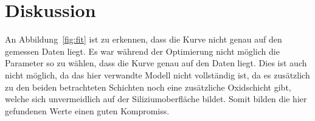 

\section{Diskussion}


An Abbildung~\ref{fig:fit} ist zu erkennen, dass die Kurve nicht genau auf den
gemessen Daten liegt. Es war während der Optimierung nicht möglich die
Parameter so zu wählen, dass die Kurve genau auf den Daten liegt.
Dies ist auch nicht möglich, da das hier verwandte Modell nicht vollständig ist,
da es zusätzlich zu den beiden betrachteten Schichten noch eine zusätzliche
Oxidschicht gibt, welche sich unvermeidlich auf der Siliziumoberfläche bildet.
Somit bilden die hier gefundenen Werte einen guten Kompromiss.
